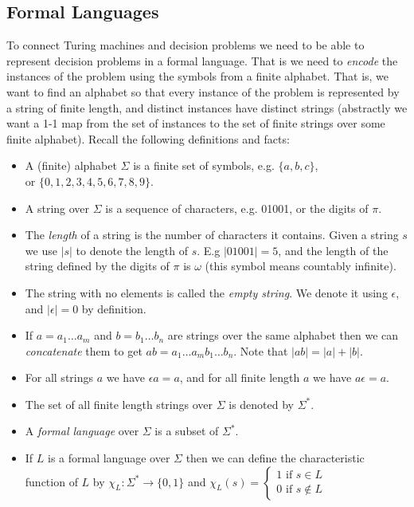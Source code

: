 \documentclass{article}
\theoremstyle{plain}
\begin{document}
\subsection{Formal Languages}
To connect Turing machines and decision problems we need to be able to represent decision problems in a formal language. That is we need to \emph{encode} the instances of the problem using the symbols from a finite alphabet. That is, we want to find an alphabet so that every instance of the problem is represented by a string of finite length, and distinct instances have distinct strings (abstractly we want a 1-1 map from the set of instances to the set of finite strings over some finite alphabet). Recall the following definitions and facts:
\begin{itemize}
\item A (finite) alphabet $\Sigma$ is a finite set of symbols, e.g. $\{a,b,c\}$,\\ or $\{0,1,2,3,4,5,6,7,8,9\}$.
\item A string over $\Sigma$ is a sequence of characters, e.g. 01001, or the digits of $\pi$.
\item The \emph{length} of a string is the number of characters it contains. Given a string $s$ we use $|s|$ to denote the length of $s$. E.g $|01001|=5$, and the length of the string defined by the digits of $\pi$ is $\omega$ (this symbol means countably infinite).
\item The string with no elements is called the \emph{empty string}. We denote it using $\epsilon$, and $|\epsilon|=0$ by definition.
\item If $a=a_1\ldots a_m$ and $b=b_1\ldots b_n$ are strings over the same alphabet then we can \emph{concatenate} them to get $ab=a_1\ldots a_m b_1\ldots b_n$. Note that $|ab|=|a|+|b|$.
\item For all strings $a$ we have $\epsilon a = a$, and for all finite length $a$ we have $a\epsilon=a$.
\item The set of all finite length strings over $\Sigma$ is denoted by $\Sigma^*$.
\item A \emph{formal language} over $\Sigma$ is a subset of $\Sigma^*$.
\item If $L$ is a formal language over $\Sigma$ then we can define the characteristic function of $L$ by $\chi_L:\Sigma^*\to\{0,1\}$ and $\chi_L(s) = \begin{cases}1 \text{ if } s\in L \\
0 \text{ if } s\notin L \end{cases}$   
\end{itemize}
\end{document}
